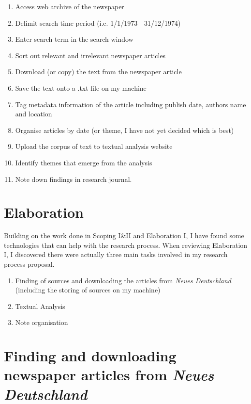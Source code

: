 \documentclass{article}
\begin{document}
\begin{enumerate}
    \item Access web archive of the newspaper
    \item Delimit search time period (i.e. 1/1/1973 - 31/12/1974)
    \item Enter search term in the search window
    \item Sort out relevant and irrelevant newspaper articles
    \item Download (or copy) the text from the newspaper article
    \item Save the text onto a .txt file on my machine
    \item Tag metadata information of the article including publish date, authors name and location
    \item Organise articles by date (or theme, I have not yet decided which is best)
    \item Upload the corpus of text to textual analysis website
    \item Identify themes that emerge from the analysis
    \item Note down findings in research journal.
\end{enumerate}


\section*{Elaboration}

Building on the work done in Scoping I\&II and Elaboration I, I have found some technologies that can help with the research process. When reviewing Elaboration I, I discovered there were actually three main tasks involved in my research process proposal.

\begin{enumerate}
    \item Finding of sources and downloading the articles from \textit{Neues Deutschland} (including the storing of sources on my machine)
    \item Textual Analysis
    \item Note organisation
\end{enumerate}

\newpage
\section*{Finding and downloading newspaper articles from \textit{Neues Deutschland}}
\end{document}

